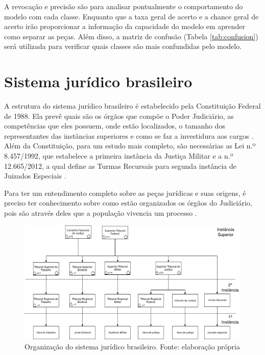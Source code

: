 A revocação e precisão são para analisar pontualmente o comportamento do modelo com cada classe. Enquanto que a taxa geral de acerto e a chance geral de acerto irão proporcionar a informação da capacidade do modelo em aprender como separar as peças. Além disso, a matriz de confusão (Tabela \ref{tab:confusion}) será utilizada para verificar quais classes são mais confundidas pelo modelo.

\section{Sistema jurídico brasileiro}

A estrutura do sistema jurídico brasileiro é estabelecido pela Constituição Federal de 1988. Ela prevê quais são os órgãos que compõe o Poder Judiciário, as competências que eles possuem, onde estão localizados, o tamanho dos representantes das instâncias superiores e como se faz a investidura aos cargos \cite{BRASIL1988}. Além da Constituição, para um estudo mais completo, são necessárias as Lei n.º 8.457/1992, que estabelece a primeira instância da Justiça Militar \cite{BRASIL1992} e a n.º 12.665/2012, a qual define as Turmas Recursais para segunda instância de Juizados Especiais \cite{BRASIL2012}.

Para ter um entendimento completo sobre as peças jurídicas e suas origens, é preciso ter conhecimento sobre como estão organizados os órgãos do Judiciário, pois são através deles que a população vivencia um processo \cite{JUNIOR2012}.

\begin{figure}[h]
	\centering
    \includegraphics[keepaspectratio=true,scale=0.4]{figuras/sistemaJudiciario}
	\caption[Sistema judiciário]{Organização do sistema jurídico brasileiro. Fonte: elaboração própria}
	\label{fig:sistemaJudiciario}
\end{figure}

